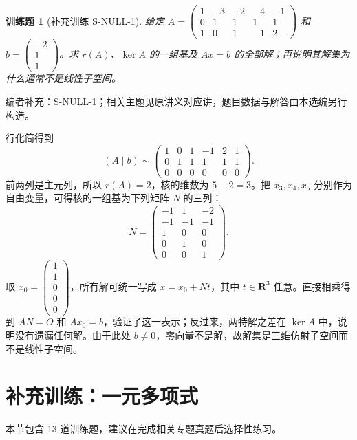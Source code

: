 \documentclass[UTF8,12pt,a4paper,fontset=fandol]{ctexart}
\newtheorem{exercise}{训练题}[section]
\begin{document}
\begin{exercise}[补充训练 S-NULL-1]\label{prob:S-NULL-1}
给定 $A=\begin{pmatrix}1&-3&-2&-4&-1\\0&1&1&1&1\\1&0&1&-1&2\end{pmatrix}$ 和 $b=\begin{pmatrix}-2\\1\\1\end{pmatrix}$。求 $r(A)$、$\ker A$ 的一组基及 $Ax=b$ 的全部解；再说明其解集为什么通常不是线性子空间。
\end{exercise}
\noindent 编者补充：S-NULL-1；相关主题见原讲义对应讲，题目数据与解答由本选编另行构造。
\begin{solve}
行化简得到
\[(A\mid b)\sim \begin{pmatrix}1&0&1&-1&2&1\\0&1&1&1&1&1\\0&0&0&0&0&0\end{pmatrix}.\]
前两列是主元列，所以 $r(A)=2$，核的维数为 $5-2=3$。把 $x_3,x_4,x_5$ 分别作为自由变量，可得核的一组基为下列矩阵 $N$ 的三列：
\[N=\begin{pmatrix}-1&1&-2\\-1&-1&-1\\1&0&0\\0&1&0\\0&0&1\end{pmatrix}.\]
取 $x_0=\begin{pmatrix}1\\1\\0\\0\\0\end{pmatrix}$，所有解可统一写成 $x=x_0+Nt$，其中 $t\in\mathbf R^3$ 任意。直接相乘得到 $AN=O$ 和 $Ax_0=b$，验证了这一表示；反过来，两特解之差在 $\ker A$ 中，说明没有遗漏任何解。由于此处 $b\ne0$，零向量不是解，故解集是三维仿射子空间而不是线性子空间。
\end{solve}

\section{补充训练：一元多项式}

本节包含 13 道训练题，建议在完成相关专题真题后选择性练习。
\end{document}
